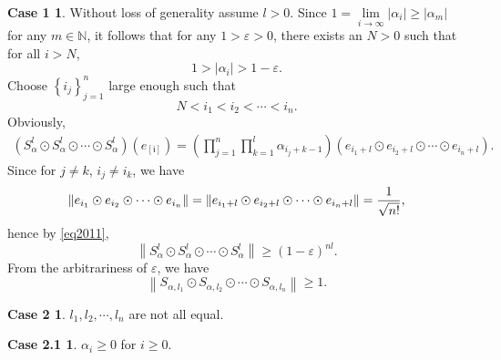 \documentclass[11pt]{article}
\theoremstyle{plain}
\theoremstyle{definition}
\newtheorem*{case1}{Case 1}
\newtheorem*{case2}{Case 2}
\newtheorem*{case2.1}{Case 2.1}
\begin{document}
{\begin{case1}
Without loss of generality assume $l>0$.   Since  $ 1=\lim\limits_{i \to \infty } \left | \alpha_{i}  \right | \ge \left | \alpha_{m}  \right | $ for any $m \in \mathbb{N}$, it follows that for any $1 > \varepsilon > 0$, there exists an $N > 0$ such that for all $i > N$, 
\begin{equation}\label{eq2011}1 > \left | \alpha_{i} \right |  > 1  - \varepsilon.\end{equation}	Choose $\left \{ i_{j} \right \} _{j=1}^{n} $ large enough such that
	\begin{equation}\label{eq21}
		N   < i_{1} < i_{2} < \cdots < i_{n}.
	\end{equation}
	Obviously,
	$$	\begin{aligned}
				\left ( S_{\alpha}^l\odot S_{\alpha}^l\odot \cdots \odot S_{\alpha}^l  \right ) \left ( e_{[\mathfrak{i}]}    \right )
		=\left(\prod\limits_{j=1}^n \prod\limits_{k=1}^l\alpha_{i_{j}+k-1}\right)\left (  e_{i_{1}+l }\odot e_{i_{2}+l }\odot \cdots \odot e_{i_{n} +l} \right ).	
	\end{aligned}$$
	Since for $j\not= k$, $i_j\not=i_k$, we have
	$$\|  e_{i_{1} }\odot e_{i_{2} }\odot \cdots \odot e_{i_{n}}\|=\left \|  e_{i_{1}+l }\odot e_{i_{2}+l }\odot \cdots \odot e_{i_{n} +l} \right \| ={ 1\over \sqrt{n!}},$$
	 hence by \eqref{eq2011},
	$$	
					\left \| S_{\alpha}^l\odot S_{\alpha}^l\odot \cdots \odot S_{\alpha}^l\right \|\geq
			\left ( 1 - \varepsilon \right ) ^{nl}.
$$
	From the arbitrariness of $\varepsilon$, we have
	$$\left \|  S_{\alpha,{l_{1}}}\odot S_{\alpha,{l_{2}}}\odot \cdots \odot S_{\alpha,{l_{n}}}  \right \|  \ge 1.$$
	\end{case1}
	\begin{case2}
		 $l_{1},l_{2},\cdots,l_{n}$  are not all equal.
		\begin{case2.1}\label{case2.1} $\alpha_i \geq 0$ for $i\geq 0.$
	 


\end{case2.1}
\end{case2}}
\end{document}
